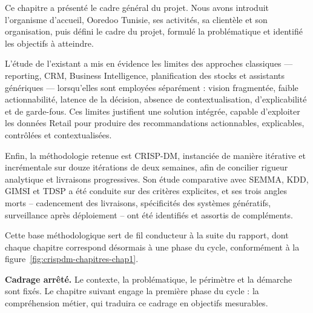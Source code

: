Ce chapitre a présenté le cadre général du projet. Nous avons introduit l'organisme d'accueil, Ooredoo Tunisie, ses activités, sa clientèle et son organisation, puis défini le cadre du projet, formulé la problématique et identifié les objectifs à atteindre.

L'étude de l'existant a mis en évidence les limites des approches classiques — reporting, CRM, Business Intelligence, planification des stocks et assistants génériques — lorsqu'elles sont employées séparément : vision fragmentée, faible actionnabilité, latence de la décision, absence de contextualisation, d'explicabilité et de garde-fous. Ces limites justifient une solution intégrée, capable d'exploiter les données Retail pour produire des recommandations actionnables, explicables, contrôlées et contextualisées.

Enfin, la méthodologie retenue est CRISP-DM, instanciée de manière itérative et incrémentale sur douze itérations de deux semaines, afin de concilier rigueur analytique et livraisons progressives. Son étude comparative avec SEMMA, KDD, GIMSI et TDSP a été conduite sur des critères explicites, et ses trois angles morts -- cadencement des livraisons, spécificités des systèmes génératifs, surveillance après déploiement -- ont été identifiés et assortis de compléments.

Cette base méthodologique sert de fil conducteur à la suite du rapport, dont chaque chapitre correspond désormais à une phase du cycle, conformément à la figure~\ref{fig:crispdm-chapitres-chap1}.

\textbf{Cadrage arrêté.} Le contexte, la problématique, le périmètre et la démarche sont fixés. Le chapitre suivant engage la première phase du cycle : la compréhension métier, qui traduira ce cadrage en objectifs mesurables.
